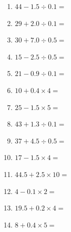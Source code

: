 \documentclass[12pt]{article}
\begin{document}
\begin{enumerate}
\item \large $ 44 - 1.5 \div 0.1 = $ \vspace{1.6cm}
\item \large $ 29 + 2.0 \div 0.1 = $ \vspace{1.6cm}
\item \large $ 30 + 7.0 \div 0.5 = $ \vspace{1.6cm}
\item \large $ 15 - 2.5 \div 0.5 = $ \vspace{1.6cm}
\newpage
\item \large $ 21 - 0.9 \div 0.1 = $ \vspace{1.6cm}
\item \large $ 10 + 0.4 \times 4 = $ \vspace{1.6cm}
\item \large $ 25 - 1.5 \times 5 = $ \vspace{1.6cm}
\item \large $ 43 + 1.3 \div 0.1 = $ \vspace{1.6cm}
\item \large $ 37 + 4.5 \div 0.5 = $ \vspace{1.6cm}
\item \large $ 17 - 1.5 \times 4 = $ \vspace{1.6cm}
\item \large $ 44.5 + 2.5 \times 10 = $ \vspace{1.6cm}
\item \large $ 4 - 0.1 \times 2 = $ \vspace{1.6cm}
\item \large $ 19.5 + 0.2 \times 4 = $ \vspace{1.6cm}
\item \large $ 8 + 0.4 \times 5 = $ \vspace{1.6cm}
\end{enumerate}
\newpage
\end{document}
